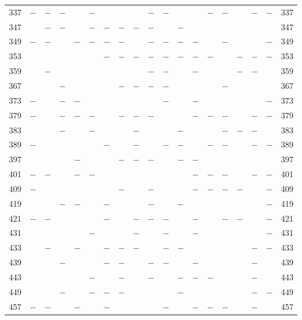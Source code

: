 \begin{center}
\begin{tabular}{r|c|c|c|c|c|c|c|c|c|c|c|c|c|c|c|c|c|r}
337 & $-$ & $-$ & $-$ &  & $-$ &  &  &  & $-$ & $-$ &  &  & $-$ & $-$ &  & $-$ & $-$ & 337\\
347 &  & $-$ & $-$ &  & $-$ & $-$ & $-$ & $-$ & $-$ &  & $-$ &  &  &  &  &  &  & 347\\
349 & $-$ & $-$ &  & $-$ & $-$ & $-$ & $-$ &  & $-$ & $-$ & $-$ & $-$ &  & $-$ &  &  & $-$ & 349\\
353 &  &  &  &  &  & $-$ & $-$ & $-$ & $-$ & $-$ & $-$ & $-$ & $-$ &  & $-$ & $-$ & $-$ & 353\\
359 &  & $-$ &  &  &  &  &  &  & $-$ & $-$ &  & $-$ &  &  & $-$ & $-$ &  & 359\\
367 &  &  & $-$ &  &  &  & $-$ & $-$ & $-$ & $-$ &  &  &  & $-$ &  &  &  & 367\\
373 & $-$ &  & $-$ & $-$ &  &  &  &  &  & $-$ &  & $-$ &  &  &  &  & $-$ & 373\\
379 & $-$ &  & $-$ & $-$ & $-$ &  & $-$ & $-$ & $-$ &  &  & $-$ & $-$ & $-$ &  & $-$ & $-$ & 379\\
383 &  &  & $-$ &  & $-$ &  &  & $-$ &  &  & $-$ &  &  & $-$ & $-$ & $-$ &  & 383\\
389 & $-$ &  &  &  &  & $-$ &  & $-$ &  & $-$ & $-$ &  & $-$ & $-$ &  & $-$ & $-$ & 389\\
397 &  &  &  & $-$ &  &  & $-$ & $-$ & $-$ &  & $-$ & $-$ &  &  &  &  &  & 397\\
401 & $-$ & $-$ &  & $-$ & $-$ &  &  &  &  &  &  & $-$ & $-$ & $-$ &  & $-$ & $-$ & 401\\
409 & $-$ &  &  &  &  &  & $-$ &  & $-$ &  &  & $-$ & $-$ & $-$ & $-$ &  & $-$ & 409\\
419 &  &  & $-$ & $-$ &  & $-$ &  &  & $-$ &  & $-$ &  &  &  &  &  & $-$ & 419\\
421 & $-$ & $-$ &  &  &  & $-$ &  & $-$ & $-$ & $-$ &  & $-$ &  & $-$ & $-$ &  & $-$ & 421\\
431 &  &  &  &  & $-$ &  &  & $-$ &  & $-$ &  & $-$ &  &  &  &  & $-$ & 431\\
433 &  & $-$ &  & $-$ &  & $-$ & $-$ & $-$ &  & $-$ & $-$ &  &  &  &  & $-$ & $-$ & 433\\
439 &  &  & $-$ &  &  & $-$ & $-$ &  & $-$ & $-$ &  & $-$ &  &  &  & $-$ &  & 439\\
443 &  &  &  &  & $-$ &  & $-$ &  & $-$ &  & $-$ & $-$ & $-$ &  &  & $-$ &  & 443\\
449 &  &  & $-$ &  & $-$ & $-$ & $-$ &  &  &  & $-$ &  &  &  &  & $-$ & $-$ & 449\\
457 & $-$ & $-$ &  & $-$ &  & $-$ &  &  &  & $-$ &  & $-$ & $-$ & $-$ &  & $-$ &  & 457\\

\end{tabular}
\end{center}
